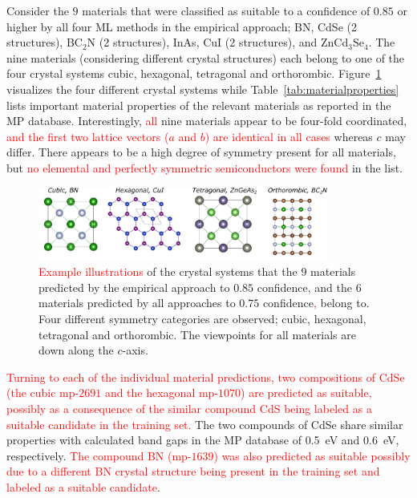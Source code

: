 \documentclass[superscriptaddress,unsortedaddress,
 amsmath,amssymb,
 aps,
]{revtex4-2}
\newcommand{\mrk}[1]{\textcolor{red}{#1}}
\begin{document}
Consider the $9$ materials that were classified as suitable to a confidence of $0.85$ or higher by all four ML methods in the empirical approach; BN, CdSe (2 structures), BC$_2$N (2 structures), InAs, CuI (2 structures), and ZnCd$_3$Se$_4$. 
The nine materials (considering different crystal structures) each belong to one of the four crystal systems cubic, hexagonal, tetragonal and orthorombic. Figure~\ref{fig:crystalsystems} visualizes the four different crystal systems while Table~\ref{tab:materialproperties} lists important material properties of the relevant materials as reported in the MP database.  Interestingly, \mrk{all} nine materials appear to be four-fold coordinated, \mrk{and the first two lattice vectors ($a$ and $b$) are identical in all cases} whereas $c$ may differ.  
There appears to be a high degree of symmetry present for all materials, but \mrk{no elemental and perfectly symmetric semiconductors were found} in the list. 

\begin{figure}[t]
    \centering
    \includegraphics[width=0.85\textwidth]{AllFigures/fig6-all.png}
    \caption{\mrk{Example illustrations} of the crystal systems that the $9$ materials predicted by the empirical approach to $0.85$ confidence, and the $6$ materials predicted by all approaches to $0.75$ confidence\mrk{,} belong to. Four different symmetry categories are observed; cubic, hexagonal, tetragonal and orthorombic. The viewpoints for all materials are down along the $c$-axis.   }
    \label{fig:crystalsystems}
\end{figure}

\mrk{Turning to each of the individual material predictions, two compositions of CdSe (the cubic mp-$2691$ and the hexagonal mp-$1070$) are predicted as suitable, possibly as a consequence of the similar compound CdS being labeled as a suitable candidate in the training set.}  
The two compounds of CdSe share similar properties with calculated band gaps in the MP database of \SI{0.5}{\electronvolt} and \SI{0.6}{\electronvolt}, respectively. 
\mrk{The compound BN (mp-$1639$) was also predicted as suitable possibly due to a different BN crystal structure being present in the training set and labeled as a suitable candidate}. 
\end{document}
